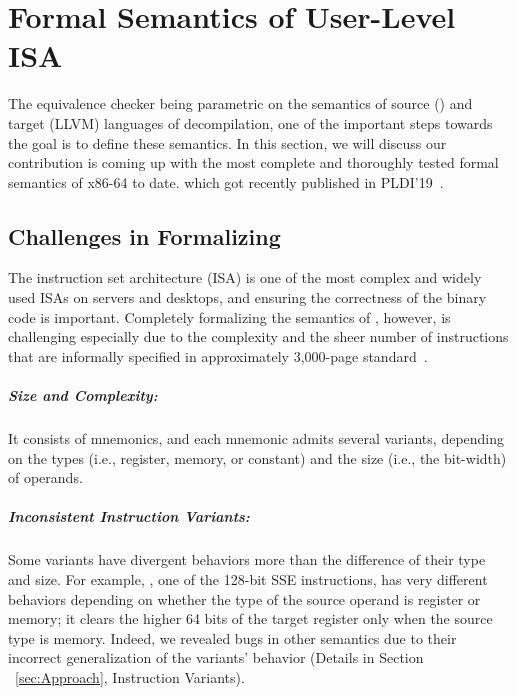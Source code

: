 \chapter{Formal Semantics of \ISA User-Level ISA}\label{sec:results}
The equivalence checker being parametric on the semantics of source (\ISA) and target (LLVM) languages of decompilation, one of the important steps towards the goal is to define these semantics. In this section, we will discuss our contribution is coming up with the most complete and thoroughly tested formal
semantics of x86-64 to date. which got recently published in PLDI'19~\cite{DasguptaAdve:PLDI19}.


\section{Challenges in Formalizing \ISA}
\label{sec:challenges-in-formalizing-x86}
The \ISA instruction set architecture (ISA) is one of the most complex and widely used ISAs on servers and desktops, and ensuring the correctness of the \ISA binary code is important.
%
Completely formalizing the semantics of \ISA, however, is challenging especially due to the complexity and the sheer number of instructions that are informally specified in approximately 3,000-page standard~\cite{IntelManual}.

\paragraph{Size and Complexity:}
%
It consists of \totalIntel{} mnemonics, and each mnemonic admits several variants, depending on the types (i.e., register, memory, or constant) and the size (i.e., the bit-width) of operands.

\paragraph{Inconsistent Instruction Variants:}
%
Some variants have divergent behaviors more than the difference of their type and size. For example, , one of the 128-bit SSE instructions, has very different behaviors depending on whether the type of the source operand is register or memory; it clears the higher 64 bits of the target register only when the source type is memory.
Indeed, we revealed bugs in other semantics due to their incorrect generalization of the variants' behavior (Details in Section ~\ref{sec:Approach}, Instruction Variants).

